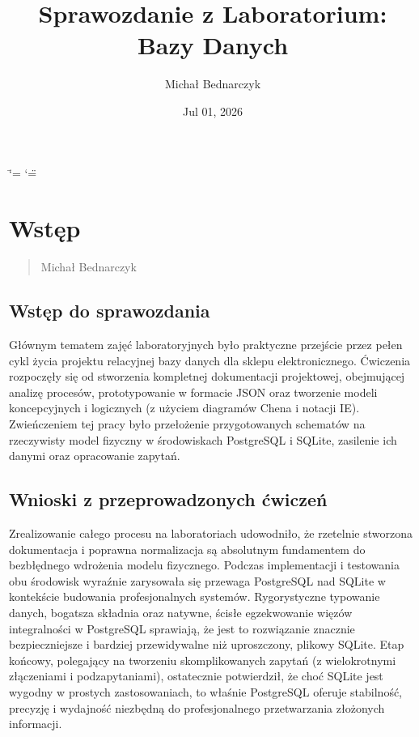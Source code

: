 \documentclass[a4paper,11pt,english,openany,oneside]{sphinxmanual}
\title{Sprawozdanie z Laboratorium: Bazy Danych}
\date{Jul 01, 2026}
\author{Michał Bednarczyk}
\begin{document}
\ifdefined\shorthandoff
  \ifnum\catcode`\=\string=\active\shorthandoff{=}\fi
  \ifnum\catcode`\"=\active{}\fi
\fi

\pagestyle{empty}
\sphinxmaketitle
\pagestyle{plain}
\sphinxtableofcontents
\pagestyle{normal}
\label{\detokenize{index::doc}}


\sphinxstepscope


\chapter{Wstęp}
\label{\detokenize{rozdzial_1/index:wstep}}\label{\detokenize{rozdzial_1/index::doc}}\begin{quote}\begin{description}
\sphinxAtStartPar
Michał Bednarczyk

\end{description}\end{quote}


\section{Wstęp do sprawozdania}
\label{\detokenize{rozdzial_1/index:wstep-do-sprawozdania}}
\sphinxAtStartPar
Głównym tematem zajęć laboratoryjnych było praktyczne przejście przez pełen cykl życia projektu relacyjnej bazy danych dla sklepu elektronicznego. Ćwiczenia rozpoczęły się od stworzenia kompletnej dokumentacji projektowej, obejmującej analizę procesów, prototypowanie w formacie JSON oraz tworzenie modeli koncepcyjnych i logicznych (z użyciem diagramów Chena i notacji IE). Zwieńczeniem tej pracy było przełożenie przygotowanych schematów na rzeczywisty model fizyczny w środowiskach PostgreSQL i SQLite, zasilenie ich danymi oraz opracowanie zapytań.


\section{Wnioski z przeprowadzonych ćwiczeń}
\label{\detokenize{rozdzial_1/index:wnioski-z-przeprowadzonych-cwiczen}}
\sphinxAtStartPar
Zrealizowanie całego procesu na laboratoriach udowodniło, że rzetelnie stworzona dokumentacja i poprawna normalizacja są absolutnym fundamentem do bezbłędnego wdrożenia modelu fizycznego. Podczas implementacji i testowania obu środowisk wyraźnie zarysowała się przewaga PostgreSQL nad SQLite w kontekście budowania profesjonalnych systemów. Rygorystyczne typowanie danych, bogatsza składnia oraz natywne, ścisłe egzekwowanie więzów integralności w PostgreSQL sprawiają, że jest to rozwiązanie znacznie bezpieczniejsze i bardziej przewidywalne niż uproszczony, plikowy SQLite. Etap końcowy, polegający na tworzeniu skomplikowanych zapytań (z wielokrotnymi złączeniami i podzapytaniami), ostatecznie potwierdził, że choć SQLite jest wygodny w prostych zastosowaniach, to właśnie PostgreSQL oferuje stabilność, precyzję i wydajność niezbędną do profesjonalnego przetwarzania złożonych informacji.
\end{document}
